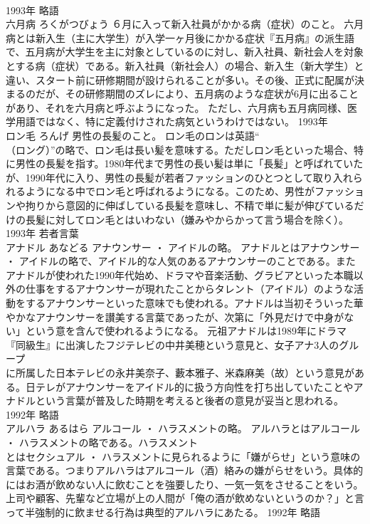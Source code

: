 \documentclass[8pt]{extreport}
\begin{document}
\begin{CJK}{UTF8}{min}
\\	1993年	略語	
\\	六月病	ろくがつびょう	６月に入って新入社員がかかる病（症状）のこと。	六月病とは新入生（主に大学生）が入学一ヶ月後にかかる症状『五月病』の派生語で、五月病が大学生を主に対象としているのに対し、新入社員、新社会人を対象とする病（症状）である。新入社員（新社会人）の場合、新入生（新大学生）と違い、スタート前に研修期間が設けられることが多い。その後、正式に配属が決まるのだが、その研修期間のズレにより、五月病のような症状が6月に出ることがあり、それを六月病と呼ぶようになった。 ただし、六月病も五月病同様、医学用語ではなく、特に定義付けされた病気というわけではない。	1993年	
\\	ロン毛	ろんげ	男性の長髪のこと。	ロン毛のロンは英語“
\\	（ロング）”の略で、ロン毛は長い髪を意味する。ただしロン毛といった場合、特に男性の長髪を指す。1980年代まで男性の長い髪は単に「長髪」と呼ばれていたが、1990年代に入り、男性の長髪が若者ファッションのひとつとして取り入れられるようになる中でロン毛と呼ばれるようになる。このため、男性がファッションや拘りから意図的に伸ばしている長髪を意味し、不精で単に髪が伸びているだけの長髪に対してロン毛とはいわない（嫌みやからかって言う場合を除く）。	1993年	若者言葉	
\\	アナドル	あなどる	アナウンサー ・ アイドルの略。	アナドルとはアナウンサー ・ アイドルの略で、アイドル的な人気のあるアナウンサーのことである。またアナドルが使われた1990年代始め、ドラマや音楽活動、グラビアといった本職以外の仕事をするアナウンサーが現れたことからタレント（アイドル）のような活動をするアナウンサーといった意味でも使われる。アナドルは当初そういった華やかなアナウンサーを讃美する言葉であったが、次第に「外見だけで中身がない」という意を含んで使われるようになる。 元祖アナドルは1989年にドラマ『同級生』に出演したフジテレビの中井美穂という意見と、女子アナ3人のグループ
\\	に所属した日本テレビの永井美奈子、藪本雅子、米森麻美（故）という意見がある。日テレがアナウンサーをアイドル的に扱う方向性を打ち出していたことやアナドルという言葉が普及した時期を考えると後者の意見が妥当と思われる。	1992年	略語	
\\	アルハラ	あるはら	アルコール ・ ハラスメントの略。	アルハラとはアルコール ・ ハラスメントの略である。ハラスメント
\\	とはセクシュアル ・ ハラスメントに見られるように「嫌がらせ」という意味の言葉である。つまりアルハラはアルコール（酒）絡みの嫌がらせをいう。具体的にはお酒が飲めない人に飲むことを強要したり、一気一気をさせることをいう。上司や顧客、先輩など立場が上の人間が「俺の酒が飲めないというのか？」と言って半強制的に飲ませる行為は典型的アルハラにあたる。	1992年	略語	

\end{CJK}
\end{document}
